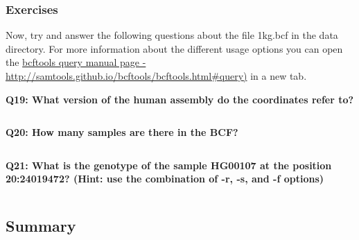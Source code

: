 \documentclass[11pt]{article}
\makeatletter
\newcommand{\boxspacing}{\kern\kvtcb@left@rule\kern\kvtcb@boxsep}
\newcommand{\prompt}[4]{
        {\ttfamily\llap{{\color{blue}\LARGE\faKeyboardO\hspace{3pt}#4}}\vspace{-\baselineskip}}
    }
\makeatother
\begin{document}
    \hypertarget{exercises}{%
\subsubsection{Exercises}\label{exercises}}

Now, try and answer the following questions about the file 1kg.bcf in
the data directory. For more information about the different usage
options you can open the
\href{http://samtools.github.io/bcftools/bcftools.html\#query}{bcftools
query manual page -
http://samtools.github.io/bcftools/bcftools.html\#query)} in a new tab.

    \textbf{Q19: What version of the human assembly do the coordinates refer
to?}

    \begin{tcolorbox}[breakable, size=fbox, boxrule=1pt, pad at break*=1mm,colback=cellbackground, colframe=cellborder]
\prompt{In}{incolor}{ }{\boxspacing}
\begin{Verbatim}[commandchars=\\\{\}]

\end{Verbatim}
\end{tcolorbox}

    \textbf{Q20: How many samples are there in the BCF?}

    \begin{tcolorbox}[breakable, size=fbox, boxrule=1pt, pad at break*=1mm,colback=cellbackground, colframe=cellborder]
\prompt{In}{incolor}{ }{\boxspacing}
\begin{Verbatim}[commandchars=\\\{\}]

\end{Verbatim}
\end{tcolorbox}

    \textbf{Q21: What is the genotype of the sample HG00107 at the position
20:24019472? (Hint: use the combination of -r, -s, and -f options)}

    \begin{tcolorbox}[breakable, size=fbox, boxrule=1pt, pad at break*=1mm,colback=cellbackground, colframe=cellborder]
\prompt{In}{incolor}{ }{\boxspacing}
\begin{Verbatim}[commandchars=\\\{\}]

\end{Verbatim}
\end{tcolorbox}

    \hypertarget{summary}{%
\subsection{Summary}\label{summary}}
\end{document}
